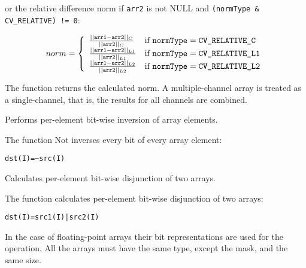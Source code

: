or the relative difference norm if \texttt{arr2} is not NULL and \texttt{(normType \& CV\_RELATIVE) != 0}:

\[
norm = \left\{ \begin{array}{l l} \frac{||\texttt{arr1}-\texttt{arr2}||_C    }{||\texttt{arr2}||_C   } & \mbox{if $\texttt{normType} = \texttt{CV\_RELATIVE\_C}$}\\ \frac{||\texttt{arr1}-\texttt{arr2}||_{L1} }{||\texttt{arr2}||_{L1}} & \mbox{if $\texttt{normType} = \texttt{CV\_RELATIVE\_L1}$}\\ \frac{||\texttt{arr1}-\texttt{arr2}||_{L2} }{||\texttt{arr2}||_{L2}} & \mbox{if $\texttt{normType} = \texttt{CV\_RELATIVE\_L2}$}\\ \end{array} \right.
\]

The function returns the calculated norm. A multiple-channel array is treated as a single-channel, that is, the results for all channels are combined.

Performs per-element bit-wise inversion of array elements.


\begin{description}
\end{description}


The function Not inverses every bit of every array element:

\begin{lstlisting}
dst(I)=~src(I)
\end{lstlisting}


Calculates per-element bit-wise disjunction of two arrays.


\begin{description}
\end{description}


The function calculates per-element bit-wise disjunction of two arrays:

\begin{lstlisting}
dst(I)=src1(I)|src2(I)
\end{lstlisting}

In the case of floating-point arrays their bit representations are used for the operation. All the arrays must have the same type, except the mask, and the same size.

